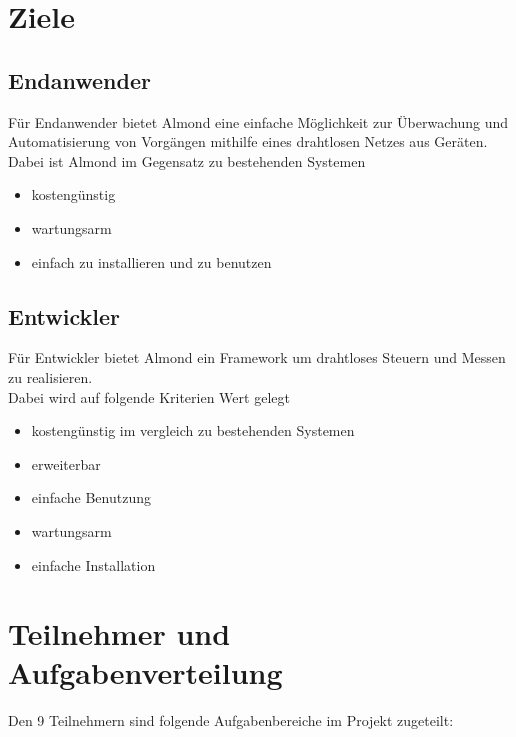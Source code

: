 \documentclass[12pt,a4paper]{article}
\begin{document}
\section{Ziele}

\subsection{Endanwender}

Für Endanwender bietet Almond eine einfache Möglichkeit zur Überwachung und Automatisierung von Vorgängen mithilfe eines drahtlosen Netzes aus Geräten. \\
Dabei ist Almond im Gegensatz zu bestehenden Systemen

\begin{itemize}
	\item kostengünstig
	\item wartungsarm
	\item einfach zu installieren und zu benutzen
\end{itemize}

\subsection{Entwickler}

Für Entwickler bietet Almond ein Framework um drahtloses Steuern und Messen zu realisieren. \\
Dabei wird auf folgende Kriterien Wert gelegt

\begin{itemize}
	\item kostengünstig im vergleich zu bestehenden Systemen
	\item erweiterbar
	\item einfache Benutzung
	\item wartungsarm
	\item einfache Installation
\end{itemize}

\section{Teilnehmer und Aufgabenverteilung}

Den 9 Teilnehmern sind folgende Aufgabenbereiche im Projekt zugeteilt:\\
\end{document}
